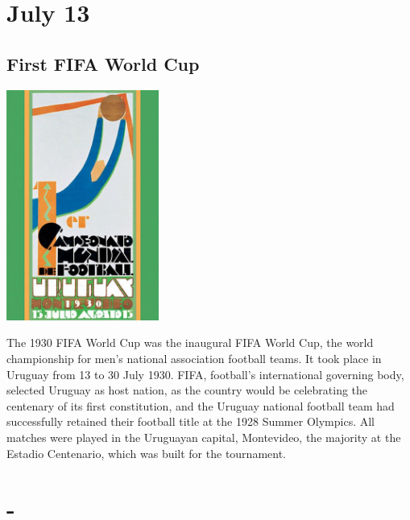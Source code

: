 \documentclass[11pt]{report}
\begin{document}
\section{July 13}
\subsection{First FIFA World Cup}
\vspace{2mm}\begin{center}\includegraphics[width=5cm]{./img/fifa1930.jpg}\end{center}
The 1930 FIFA World Cup was the inaugural FIFA World Cup, the world championship for men's national association football teams. It took place in Uruguay from 13 to 30 July 1930. FIFA, football's international governing body, selected Uruguay as host nation, as the country would be celebrating the centenary of its first constitution, and the Uruguay national football team had successfully retained their football title at the 1928 Summer Olympics. All matches were played in the Uruguayan capital, Montevideo, the majority at the Estadio Centenario, which was built for the tournament.
\section{-}
\end{document}
